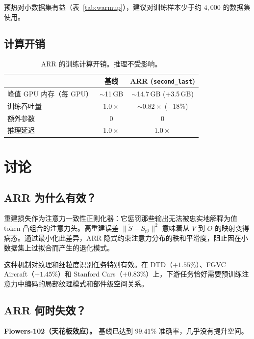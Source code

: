 \documentclass[preprint,12pt]{elsarticle}
\begin{document}
预热对小数据集有益（表~\ref{tab:warmup}），建议对训练样本少于约 $4{,}000$ 的数据集使用。

\subsection{计算开销}

\begin{table}[t]
\centering
\caption{ARR 的训练计算开销。推理不受影响。}\label{tab:overhead}
\begin{tabular}{lcc}
\toprule
 & 基线 & ARR (\texttt{second\_last}) \\
\midrule
峰值 GPU 内存（每 GPU） & $\sim$11\,GB & $\sim$14.7\,GB (+3.5\,GB) \\
训练吞吐量 & $1.0\times$ & $\sim 0.82\times$ ($-18\%$) \\
额外参数 & 0 & 0 \\
推理延迟 & $1.0\times$ & $1.0\times$ \\
\bottomrule
\end{tabular}
\end{table}

\section{讨论}\label{sec:discussion}

\subsection{ARR 为什么有效？}

重建损失作为注意力一致性正则化器：它惩罚那些输出无法被忠实地解释为值 token 凸组合的注意力头。高重建误差 $\|\tilde{S} - S_{\mathrm{gt}}\|^2$ 意味着从 $V$ 到 $O$ 的映射变得病态。通过最小化此差异，ARR 隐式约束注意力分布的秩和平滑度，阻止因在小数据集上过拟合而产生的退化模式。

这种机制对纹理和细粒度识别任务特别有效。在 DTD（$+1.55\%$）、FGVC Aircraft（$+1.45\%$）和 Stanford Cars（$+0.83\%$）上，下游任务恰好需要预训练注意力中编码的局部纹理模式和部件级空间关系。

\subsection{ARR 何时失效？}

\textbf{Flowers-102（天花板效应）。} 基线已达到 $99.41\%$ 准确率，几乎没有提升空间。
\end{document}
